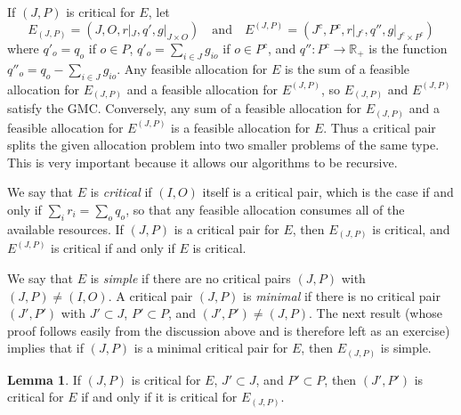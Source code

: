 \documentclass[12pt, A4paper]{article}
\theoremstyle{definition}
\newtheorem{lem}{Lemma}
\renewcommand{\Re}{\mathbb{R}}
\begin{document}
If $(J,P)$ is critical for $E$, let 
$$E_{(J,P)} = (J,O,r|_J,q',g|_{J \times O}) \quad \text{and} \quad E^{(J,P)} = (J^c, P^c, r|_{J^c},q'',g|_{J^c \times P^c})$$ where $q'_o = q_o$ if $o \in P$, $q'_o = \sum_{i \in J} g_{io}$ if $o \in P^c$, and $q'' \colon P^c \to \Re_+$ is the function $q''_o = q_o - \sum_{i \in J} g_{io}$. Any feasible allocation for $E$ is the sum of a feasible  allocation for $E_{(J,P)}$ and a feasible allocation  for  $E^{(J,P)}$, so $E_{(J,P)}$ and  $E^{(J,P)}$ satisfy the GMC.  Conversely, any sum of a feasible allocation for $E_{(J,P)}$ and a feasible allocation for $E^{(J,P)}$ is a feasible allocation for $E$. Thus a critical pair splits the given allocation problem into two smaller problems of the same type.  This is very important because it allows our algorithms to be recursive.

We say that $E$ is \emph{critical} if $(I,O)$ itself is a critical pair, which is the case if and only if $\sum_i r_i = \sum_o q_o$, so that any feasible allocation consumes all of the available resources. 
If $(J,P)$ is a critical pair for $E$, then $E_{(J,P)}$ is critical, and $E^{(J,P)}$ is critical if and only if $E$ is critical.

We say that $E$ is \emph{simple} if there are no critical pairs $(J,P)$ with $(J,P) \ne (I,O)$.  A critical pair $(J,P)$ is \emph{minimal} if there is no critical pair $(J',P')$ with $J' \subset J$, $P' \subset P$, and $(J',P') \ne (J,P)$.  The next result (whose proof follows easily from the discussion above and is therefore left as an exercise) implies that if $(J,P)$ is a minimal critical pair for $E$, then $E_{(J,P)}$ is simple.

\begin{lem} \label{lemma:MinimalSimple} 
  If $(J,P)$ is critical for $E$, $J' \subset J$, and $P' \subset P$, then $(J',P')$ is critical for $E$ if and only if it is critical for $E_{(J,P)}$.
\end{lem}

  
\end{document}
